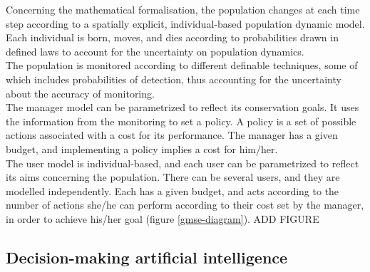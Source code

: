 \documentclass[12pt,a4paper]{article}
\begin{document}
Concerning the mathematical formalisation, the population changes at each time step according to a spatially explicit, individual-based population dynamic model.
Each individual is born, moves, and dies according to probabilities drawn in defined laws to account for the uncertainty on population dynamics.\\
The population is monitored according to different definable techniques, some of which includes probabilities of detection, thus accounting for the uncertainty about the accuracy of monitoring.\\
The manager model can be parametrized to reflect its conservation goals.
It uses the information from the monitoring to set a policy.
A policy is a set of possible actions associated with a cost for its performance.
The manager has a given budget, and implementing a policy implies a cost for him/her.\\
The user model is individual-based, and each user can be parametrized to reflect its aims concerning the population.
There can be several users, and they are modelled independently.
Each has a given budget, and acts according to the number of actions she/he can perform according to their cost set by the manager, in order to achieve his/her goal (figure \ref{gmse-diagram}). ADD FIGURE\\
%

\subsection{Decision-making artificial intelligence}
\end{document}
